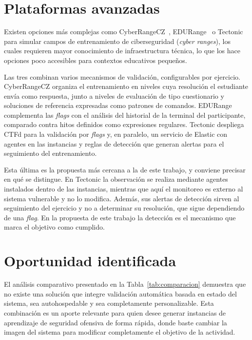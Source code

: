 \section{Plataformas avanzadas}
\label{sec:plataformas-avanzadas}

Existen opciones más complejas como CyberRangeCZ~\cite{cyberrangecz},
EDURange~\cite{edurange} o Tectonic~\cite{tectonic} para simular campos de
entrenamiento de ciberseguridad (\textit{cyber ranges}), los cuales requieren
mayor conocimiento de infraestructura técnica, lo que los hace opciones poco
accesibles para contextos educativos pequeños.

Las tres combinan varios mecanismos de validación, configurables por ejercicio.
CyberRangeCZ organiza el entrenamiento en niveles cuya resolución el estudiante
envía como respuesta, junto a niveles de evaluación de tipo cuestionario y
soluciones de referencia expresadas como patrones de comandos. EDURange
complementa las \textit{flags} con el análisis del historial de la terminal del
participante, comparado contra hitos definidos como expresiones regulares.
Tectonic despliega CTFd para la validación por \textit{flags} y, en paralelo, un
servicio de Elastic con agentes en las instancias y reglas de detección que
generan alertas para el seguimiento del entrenamiento.

Esta última es la propuesta más cercana a la de este trabajo, y conviene
precisar en qué se distingue. En Tectonic la observación se realiza mediante
agentes instalados dentro de las instancias, mientras que aquí el monitoreo es
externo al sistema vulnerable y no lo modifica. Además, sus alertas de detección
sirven al seguimiento del ejercicio y no a determinar su resolución, que sigue
dependiendo de una \textit{flag}. En la propuesta de este trabajo la detección
es el mecanismo que marca el objetivo como cumplido. 

\section{Oportunidad identificada}

El análisis comparativo presentado en la Tabla~\ref{tab:comparacion} demuestra
que no existe una solución que integre validación automática basada en estado
del sistema, sea autohospedable y sea completamente personalizable. Esta
combinación es un aporte relevante para quien desee generar instancias de
aprendizaje de seguridad ofensiva de forma rápida, donde baste cambiar la imagen
del sistema para modificar completamente el objetivo de la actividad.

